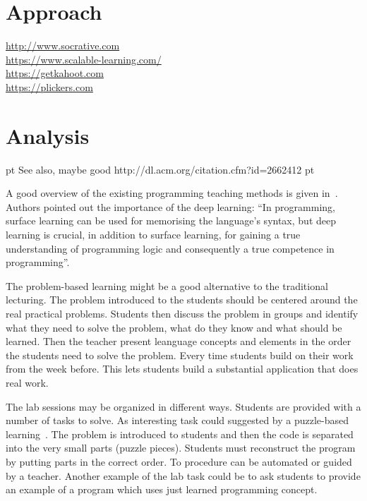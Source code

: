 \documentclass{article}
\begin{document}
\section{Approach} %
\label{sec:plan}

\url{http://www.socrative.com}\\
\url{https://www.scalable-learning.com/}\\ %
\url{https://getkahoot.com}\\
\url{https://plickers.com}

\section{Analysis} %
\label{sec:analysis}



 pt
See also, maybe good
http://dl.acm.org/citation.cfm?id=2662412
 pt


A good overview of the existing programming teaching methods is given
in~\cite{mohorovivcic2011overview}. Authors pointed out the importance
of the deep learning: ``In programming, surface learning can be used
for memorising the language’s syntax, but deep learning is crucial, in
addition to surface learning, for gaining a true understanding of
programming logic and consequently a true competence in
programming''.

The problem-based learning might be a good alternative to the
traditional lecturing.  The problem introduced to the students should
be centered around the real practical problems. Students then discuss
the problem in groups and identify what they need to solve the
problem, what do they know and what should be learned. Then the
teacher present leanguage concepts and elements in the order the
students need to solve the problem. Every time students build
on their work from the week before. This lets students build a
substantial application that does real work.


The lab sessions may be organized in different ways. Students are
provided with a number of tasks to solve. As interesting task could
suggested by a puzzle-based
learning~\cite{mohorovivcic2011overview}. The problem is introduced to
students and then the code is separated into the very small parts
(puzzle pieces). Students must reconstruct the program by putting
parts in the correct order. To procedure can be automated or guided by
a teacher. Another example of the lab task could be to ask students to
provide an example of a program which uses just learned programming
concept.
\end{document}
